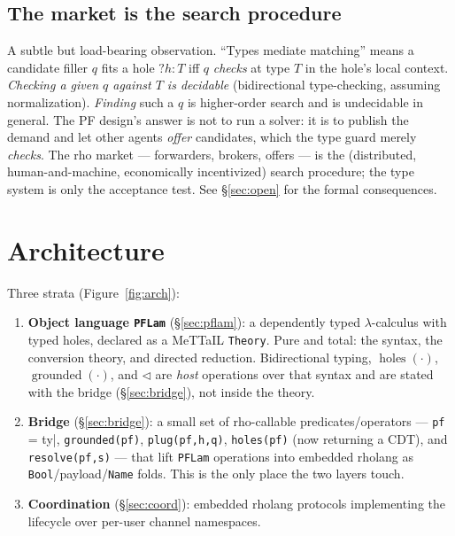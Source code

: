 \documentclass[11pt]{article}
\newcommand{\hole}[2]{\ensuremath{?#1\!:\!#2}}
\newcommand{\plug}{\mathbin{\triangleleft}}
\newcommand{\Holes}{\ensuremath{\operatorname{holes}}}
\newcommand{\grounded}{\ensuremath{\operatorname{grounded}}}
\newcommand{\code}[1]{\lstinline[language=rho,basicstyle=\ttfamily\small]|#1|}
\begin{document}
\subsection{The market is the search procedure}\label{sec:marketsearch}
A subtle but load-bearing observation. ``Types mediate matching'' means a candidate filler $q$ fits a
hole $\hole{h}{T}$ iff $q$ \emph{checks} at type $T$ in the hole's local context. \emph{Checking a
given $q$ against $T$ is decidable} (bidirectional type-checking, assuming normalization).
\emph{Finding} such a $q$ is higher-order search and is undecidable in general. The PF design's answer
is not to run a solver: it is to publish the demand and let other agents \emph{offer} candidates,
which the type guard merely \emph{checks}. The rho market --- forwarders, brokers, offers --- is the
(distributed, human-and-machine, economically incentivized) search procedure; the type system is only
the acceptance test. See \S\ref{sec:open} for the formal consequences.

\section{Architecture}\label{sec:arch}
Three strata (Figure~\ref{fig:arch}):
\begin{enumerate}[leftmargin=1.6em,itemsep=2pt]
  \item \textbf{Object language \texttt{PFLam}} (\S\ref{sec:pflam}): a dependently typed
  $\lambda$-calculus with typed holes, declared as a MeTTaIL
  \lstinline[language=mettail,basicstyle=\ttfamily\small]|Theory|. Pure and total: the syntax,
  the conversion theory, and directed reduction. Bidirectional typing, $\Holes(\cdot)$,
  $\grounded(\cdot)$, and $\plug$ are \emph{host} operations over that syntax and are stated
  with the bridge (\S\ref{sec:bridge}), not inside the theory.
  \item \textbf{Bridge} (\S\ref{sec:bridge}): a small set of rho-callable predicates/operators ---
  \code{pf |= ty}, \code{grounded(pf)}, \code{plug(pf,h,q)}, \code{holes(pf)} (now returning a CDT),
  and \code{resolve(pf,s)} --- that lift \texttt{PFLam} operations into embedded rholang as
  \texttt{Bool}/payload/\texttt{Name} folds. This is the only place the two layers touch.
  \item \textbf{Coordination} (\S\ref{sec:coord}): embedded rholang protocols implementing the
  lifecycle over per-user channel namespaces.
\end{enumerate}
\end{document}
